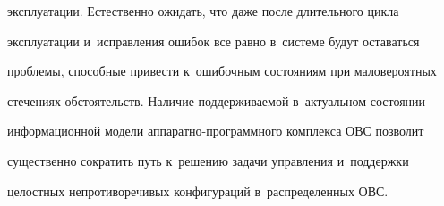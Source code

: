эксплуатации. Естественно ожидать, что даже после длительного цикла 


эксплуатации и~исправления ошибок все равно в~системе будут оставаться 


проблемы, способные привести к~ошибочным состояниям при маловероятных 


стечениях обстоятельств. Наличие поддерживаемой в~актуальном состоянии 


информационной модели ап\-па\-рат\-но-про\-грам\-мно\-го комплекса ОВС позволит 


существенно сократить путь к~решению задачи управления и~поддержки 


целостных непротиворечивых конфигураций в~распределенных ОВС.


   


